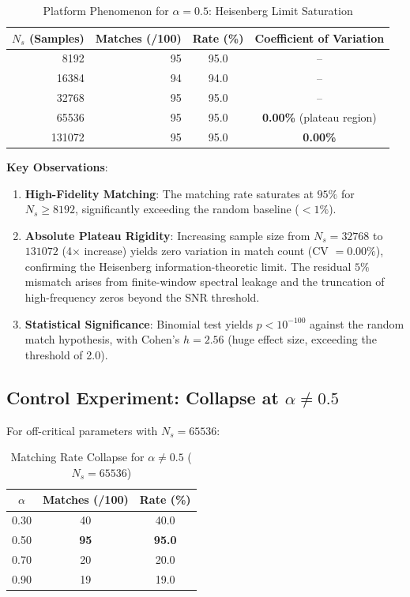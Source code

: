 \documentclass[12pt,a4paper]{article}
\theoremstyle{definition}
\theoremstyle{plain}
\theoremstyle{remark}
\begin{document}
\begin{table}[h]
\centering
\caption{Platform Phenomenon for $\alpha = 0.5$: Heisenberg Limit Saturation}
\begin{tabular}{@{}rrcc@{}} \toprule
$N_s$ (Samples) & Matches (/100) & Rate (\%) & Coefficient of Variation \\ \midrule
8192   & 95 & 95.0 & -- \\
16384  & 94 & 94.0 & -- \\
32768  & 95 & 95.0 & -- \\
65536  & 95 & 95.0 & \textbf{0.00\%} (plateau region) \\
131072 & 95 & 95.0 & \textbf{0.00\%} \\ \bottomrule
\end{tabular}
\end{table}

\textbf{Key Observations}:
\begin{enumerate}
    \item \textbf{High-Fidelity Matching}: The matching rate saturates at $95\%$ for $N_s \geq 8192$, significantly exceeding the random baseline ($< 1\%$).
    \item \textbf{Absolute Plateau Rigidity}: Increasing sample size from $N_s = 32768$ to $131072$ (4× increase) yields zero variation in match count (CV $= 0.00\%$), confirming the Heisenberg information-theoretic limit. The residual $5\%$ mismatch arises from finite-window spectral leakage and the truncation of high-frequency zeros beyond the SNR threshold.
    \item \textbf{Statistical Significance}: Binomial test yields $p < 10^{-100}$ against the random match hypothesis, with Cohen's $h = 2.56$ (huge effect size, exceeding the threshold of 2.0).
\end{enumerate}

\subsection{Control Experiment: Collapse at $\alpha \neq 0.5$}
For off-critical parameters with $N_s = 65536$:

\begin{table}[h]
\centering
\caption{Matching Rate Collapse for $\alpha \neq 0.5$ ($N_s = 65536$)}
\begin{tabular}{@{}ccc@{}} \toprule
$\alpha$ & Matches (/100) & Rate (\%) \\ \midrule
0.30 & 40 & 40.0 \\
0.50 & \textbf{95} & \textbf{95.0} \\
0.70 & 20 & 20.0 \\
0.90 & 19 & 19.0 \\ \bottomrule
\end{tabular}
\end{table}
\end{document}
